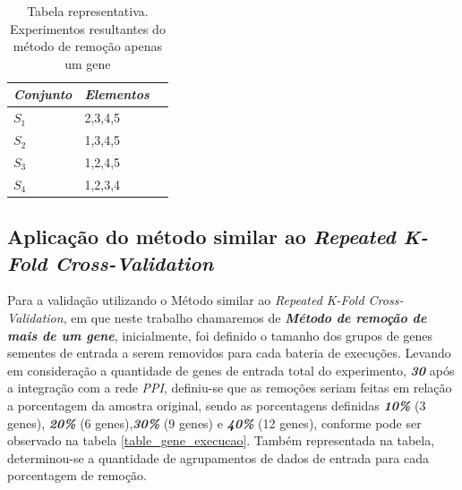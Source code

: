 %
\begin{table}[]
\centering
\caption{Tabela representativa. Experimentos resultantes do método de remoção apenas um gene}
\label{table_loo_example}
\begin{tabular}{@{}lll@{}}
\toprule
\textbf{\textsl{Conjunto}} & \textbf{\textsl{Elementos}} \\ \midrule
\textsl{\textbf{$S_1$}} & 2,3,4,5 \\
\textsl{\textbf{$S_2$}} & 1,3,4,5 \\
\textsl{\textbf{$S_3$}} & 1,2,4,5 \\
\textsl{\textbf{$S_4$}} & 1,2,3,4 \\ \bottomrule
\end{tabular}
\end{table}
%

\subsection{Aplicação do método similar ao \textsl{Repeated K-Fold Cross-Validation}}

Para a validação utilizando o Método similar ao \textsl{Repeated K-Fold Cross-Validation}, em que neste trabalho chamaremos de \textsl{\textbf{Método de remoção de mais de um gene}},
%
inicialmente, foi definido o tamanho dos grupos de genes sementes de entrada a serem removidos para cada bateria de execuções.
Levando em consideração a quantidade de genes de entrada total do experimento, \textsl{\textbf{30}} após a integração com a rede \textsl{PPI}, definiu-se que as remoções seriam feitas em relação a porcentagem da amostra original, sendo as porcentagens definidas \textbf{\textsl{10\%}} (3 genes), \textsl{\textbf{20\%}} (6 genes),\textsl{\textbf{30\%}} (9 genes) e \textsl{\textbf{40\%}} (12 genes), conforme pode ser observado na tabela \ref{table_gene_execucao}. Também representada na tabela, determinou-se a quantidade de agrupamentos de dados de entrada para cada porcentagem de remoção.

